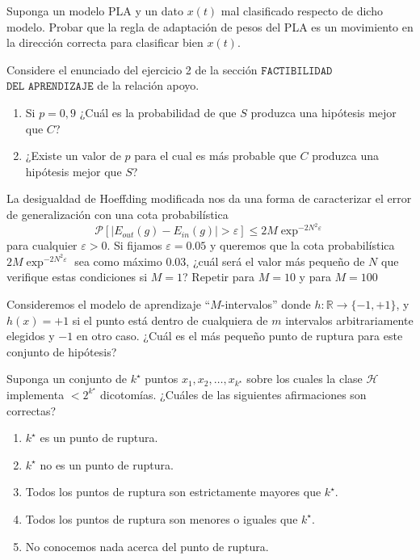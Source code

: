 \documentclass[11pt,leqno]{article}
\theoremstyle{definition}
\begin{document}
\begin{cuestion}
Suponga un modelo PLA y un dato $x(t)$ mal clasificado respecto de dicho modelo. Probar que la regla de adaptación de pesos del PLA es un movimiento en la dirección correcta
para clasificar bien $x(t)$.
\end{cuestion}

\begin{cuestion}
Considere el enunciado del ejercicio 2 de la sección $\texttt{FACTIBILIDAD}$ $\texttt{DEL APRENDIZAJE}$
de la relación apoyo.

\begin{enumerate}[a]
\item Si $p = 0,9$ ¿Cuál es la probabilidad de que $S$ produzca una hipótesis mejor que $C$?

\item ¿Existe un valor de $p$ para el cual es más probable que $C$ produzca una hipótesis mejor que $S$?
\end{enumerate}
\end{cuestion}

\begin{cuestion}
La desigualdad de Hoeffding modificada nos da una forma de caracterizar el error de generalización con una cota probabilística
\[ \mathcal{P}[ \vert E_{out}(g) - E_{in}(g) \vert > \varepsilon ]
	\leq 2M\exp^{-2N^2 \varepsilon} \]
para cualquier $\varepsilon > 0$. Si fijamos $\varepsilon = 0.05$ y queremos que la cota probabilística $ 2 M \exp^{-2N^2 \varepsilon} $ sea como máximo $0.03$, ¿cuál será el valor más pequeño de $N$ que verifique estas condiciones si $M = 1$? Repetir para $M = 10$ y para $M = 100$
\end{cuestion}

\begin{cuestion}
Consideremos el modelo de aprendizaje ``$M$-intervalos'' donde $h: \mathbb{R} \rightarrow \{-1, +1\}$, y $h(x) = +1$ si el punto está dentro de cualquiera de $m$ intervalos arbitrariamente elegidos y $-1$ en otro caso. ¿Cuál es el más pequeño punto de ruptura para este conjunto de hipótesis?
\end{cuestion}

\begin{cuestion}
Suponga un conjunto de $k^\star$ puntos $x_1, x_2, \dots , x_{k^\star}$ sobre los cuales la clase $\mathcal{H}$ implementa $<2^{k^\star}$ dicotomías. ¿Cuáles de las siguientes afirmaciones son correctas?

\begin{enumerate}[a]
\item  $k^\star$ es un punto de ruptura.
\item  $k^\star$ no es un punto de ruptura.
\item  Todos los puntos de ruptura son estrictamente mayores que $k^\star$.
\item  Todos los puntos de ruptura son menores o iguales que $k^\star$.
\item  No conocemos nada acerca del punto de ruptura.
\end{enumerate}
\end{cuestion}
\end{document}
